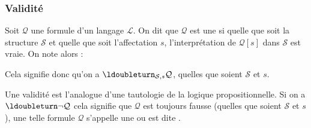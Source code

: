 \documentclass[11pt,class=report,crop=false]{standalone}
\begin{document}
%	




\subsubsection{Validité}

\begin{definition}
Soit $\mathcal{Q}$ une formule d'un langage $\mathcal{L}$.
On dit que $\mathcal{Q}$ est une  si quelle que soit la structure $\mathcal{S}$ et quelle que soit l'affectation $s$, l'interprétation de $\mathcal{Q}[s]$ dans $\mathcal{S}$ est vraie.
On note alors :
\end{definition}
Cela signifie donc qu'on a $\ldoubleturn_{\mathcal{S},s} \mathcal{Q}$, quelles que soient $\mathcal{S}$ et $s$.

Une validité est l'analogue d'une tautologie de la logique propositionnelle.
Si on a $\ldoubleturn \lnot \mathcal{Q}$ cela signifie que $\mathcal{Q}$ est toujours fausse (quelles que soient $\mathcal{S}$ et $s$), une telle formule $\mathcal{Q}$ s'appelle une  ou est dite .
\end{document}
